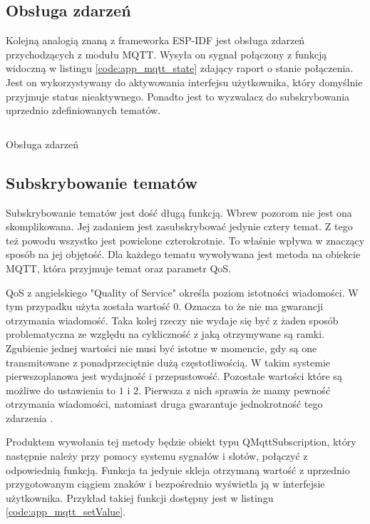       \subsection{Obsługa zdarzeń}
        Kolejną analogią znaną z frameworka ESP-IDF jest obsługa zdarzeń przychodzących z modułu MQTT. Wysyła on sygnał połączony z funkcją widoczną w listingu \ref{code:app_mqtt_state} zdający raport o stanie połączenia. Jest on wykorzystywany do aktywowania interfejsu użytkownika, który domyślnie przyjmuje status nieaktywnego. Ponadto jest to wyzwalacz do subskrybowania uprzednio zdefiniowanych tematów.
        \begin{kod}
          \inputminted[firstline=102, lastline=127]{cpp}{app/listings/mainwindow.cpp}
          \caption{Obsługa zdarzeń}
          \label{code:app_mqtt_state}
        \end{kod}
        
        
      \subsection{Subskrybowanie tematów}
        Subskrybowanie tematów jest dość długą funkcją. Wbrew pozorom nie jest ona skomplikowana. Jej zadaniem jest zasubskrybować jedynie cztery temat. Z tego też powodu wszystko jest powielone czterokrotnie. To właśnie wpływa w znaczący sposób na jej objętość. Dla każdego tematu wywoływana jest metoda na obiekcie MQTT, która przyjmuje temat oraz parametr QoS. 
        
        QoS z angielskiego "Quality of Service" określa poziom istotności wiadomości. W tym przypadku użyta została wartość $0$. Oznacza to że nie ma gwarancji otrzymania wiadomość. Taka kolej rzeczy nie wydaje się być z żaden sposób problematyczna ze względu na cykliczność z jaką otrzymywane są ramki. Zgubienie jednej wartości nie musi być istotne w momencie, gdy są one transmitowane z ponadprzeciętnie dużą częstotliwością. W takim systemie pierwszoplanowa jest wydajność i przepustowość. Pozostałe wartości które są możliwe do ustawienia to $1$ i $2$. Pierwsza z nich sprawia że mamy pewność otrzymania wiadomości, natomiast druga gwarantuje jednokrotność tego zdarzenia \cite{QoS}. 
        
        Produktem wywołania tej metody będzie obiekt typu QMqttSubscription, który następnie należy przy pomocy systemu sygnałów i slotów, połączyć z odpowiednią funkcją. Funkcja ta jedynie skleja otrzymaną wartość z uprzednio przygotowanym ciągiem znaków i bezpośrednio wyświetla ją w interfejsie użytkownika. Przykład takiej funkcji dostępny jest w listingu \ref{code:app_mqtt_setValue}. 
        
